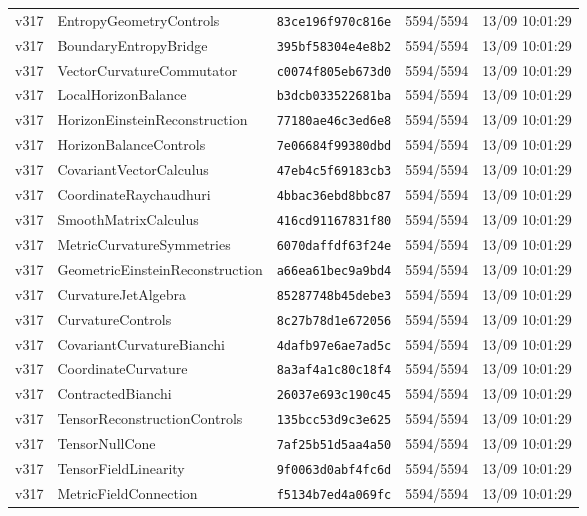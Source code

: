 \documentclass[11pt]{article}
\theoremstyle{definition}\newtheorem{deriv}{Derivação}
\begin{document}
{\begin{longtable}{@{}lllll@{}}
v317 & EntropyGeometryControls & \texttt{83ce196f970c816e} & 5594/5594 & 13/09 10:01:29 \\
v317 & BoundaryEntropyBridge & \texttt{395bf58304e4e8b2} & 5594/5594 & 13/09 10:01:29 \\
v317 & VectorCurvatureCommutator & \texttt{c0074f805eb673d0} & 5594/5594 & 13/09 10:01:29 \\
v317 & LocalHorizonBalance & \texttt{b3dcb033522681ba} & 5594/5594 & 13/09 10:01:29 \\
v317 & HorizonEinsteinReconstruction & \texttt{77180ae46c3ed6e8} & 5594/5594 & 13/09 10:01:29 \\
v317 & HorizonBalanceControls & \texttt{7e06684f99380dbd} & 5594/5594 & 13/09 10:01:29 \\
v317 & CovariantVectorCalculus & \texttt{47eb4c5f69183cb3} & 5594/5594 & 13/09 10:01:29 \\
v317 & CoordinateRaychaudhuri & \texttt{4bbac36ebd8bbc87} & 5594/5594 & 13/09 10:01:29 \\
v317 & SmoothMatrixCalculus & \texttt{416cd91167831f80} & 5594/5594 & 13/09 10:01:29 \\
v317 & MetricCurvatureSymmetries & \texttt{6070daffdf63f24e} & 5594/5594 & 13/09 10:01:29 \\
v317 & GeometricEinsteinReconstruction & \texttt{a66ea61bec9a9bd4} & 5594/5594 & 13/09 10:01:29 \\
v317 & CurvatureJetAlgebra & \texttt{85287748b45debe3} & 5594/5594 & 13/09 10:01:29 \\
v317 & CurvatureControls & \texttt{8c27b78d1e672056} & 5594/5594 & 13/09 10:01:29 \\
v317 & CovariantCurvatureBianchi & \texttt{4dafb97e6ae7ad5c} & 5594/5594 & 13/09 10:01:29 \\
v317 & CoordinateCurvature & \texttt{8a3af4a1c80c18f4} & 5594/5594 & 13/09 10:01:29 \\
v317 & ContractedBianchi & \texttt{26037e693c190c45} & 5594/5594 & 13/09 10:01:29 \\
v317 & TensorReconstructionControls & \texttt{135bcc53d9c3e625} & 5594/5594 & 13/09 10:01:29 \\
v317 & TensorNullCone & \texttt{7af25b51d5aa4a50} & 5594/5594 & 13/09 10:01:29 \\
v317 & TensorFieldLinearity & \texttt{9f0063d0abf4fc6d} & 5594/5594 & 13/09 10:01:29 \\
v317 & MetricFieldConnection & \texttt{f5134b7ed4a069fc} & 5594/5594 & 13/09 10:01:29 \\

\end{longtable}}
\end{document}
